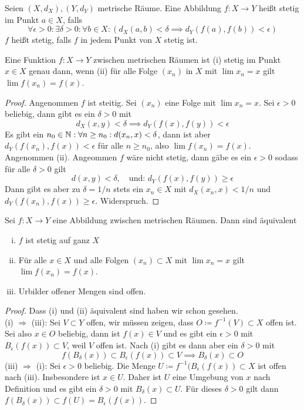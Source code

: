 \begin{defn}[Stetigkeit]
    Seien $(X,d_X), (Y,d_Y)$ metrische Räume. Eine Abbildung $f:X\to Y$ heißt stetig im Punkt $a\in X$, falls 
    \[
    \forall \epsilon > 0: \exists \delta > 0 : \forall b\in X : (d_X(a,b)<\delta \implies d_Y(f(a),f(b)) < \epsilon )    
    \] $f$ heißt stetig, falls $f$ in jedem Punkt von $X$ stetig ist. 
\end{defn}
\begin{lemma}
    Eine Funktion $f:X\to Y$ zwischen metrischen Räumen ist (i) stetig im Punkt $x\in X$ genau dann, wenn (ii) für alle Folge $(x_n)$ in $X$ mit $\lim x_n =x$ gilt $\lim f(x_n) = f(x)$.
\end{lemma}
\begin{proof}
    Angenommen $f$ ist steitig. Sei $(x_n)$ eine Folge mit $\lim x_n =x$. Sei $\epsilon>0$ beliebig, dann gibt es ein $\delta >0$ mit 
    \[
    d_X(x,y) < \delta \implies d_Y(f(x),f(y))<\epsilon    
    \]Es gibt ein $n_0\in \mathbb{N}:\forall n\ge n_0 : d(x_n,x)<\delta$, dann ist aber $d_Y(f(x_n),f(x))<\epsilon$ für alle $n\ge n_0$, also $\lim f(x_n) =f(x)$. \\
    Angenommen (ii).  Angeommen $f$ wäre nicht stetig, dann gäbe es ein $\epsilon>0$ sodass für alle $\delta >0$ gilt
    \[
    d(x,y) < \delta, \quad \text{und: } d_Y(f(x),f(y)) \ge \epsilon    
    \] 
    Dann gibt es aber zu $\delta = 1/n$ stets ein $x_n\in X$ mit $d_X(x_n,x)<1/n$ und $d_Y(f(x_n),f(x))\ge \epsilon$. Widerspruch.
\end{proof}
\begin{lemma}
    Sei $f:X\to Y$ eine Abbildung zwischen metrischen Räumen. Dann sind äquivalent
    \begin{enumerate}[(i)]
        \item $f$ ist stetig auf ganz $X$
        \item Für alle $x\in X$ und alle Folgen $(x_n)\subset X$ mit $\lim x_n =x$ gilt $\lim f(x_n) = f(x)$.
        \item Urbilder offener Mengen sind offen.
    \end{enumerate} 
    \begin{proof}
        Dass (i) und (ii) äquivalent sind haben wir schon gesehen. \\ (i) $\Rightarrow$ (iii): Sei $V\subset Y$ offen, wir müssen zeigen, dass $O\coloneqq f^{-1}(V) \subset X$ offen ist. Sei also $x\in O$ beliebig, dann ist $f(x)\in V$ und es gibt ein $\epsilon>0$ mit $B_\epsilon(f(x))\subset V$, weil $V$ offen ist. Nach (i) gibt es dann aber ein $\delta >0$ mit \[ f(B_\delta(x))\subset B_\epsilon(f(x))\subset V \implies B_\delta(x)\subset O\]
        (iii) $\Rightarrow$ (i): Sei $\epsilon > 0$ beliebig. Die Menge $U\coloneqq f^{-1}(B_\epsilon(f(x))\subset X$ ist offen nach (iii). Insbesondere ist $x\in U$. Daher ist $U$ eine Umgebung von $x$ nach Definition und es gibt ein $\delta > 0$ mit $B_\delta(x)\subset U$. Für dieses $\delta>0$ gilt dann $f(B_\delta(x))\subset f(U)= B_\epsilon(f(x))$.
    \end{proof}
\end{lemma}

